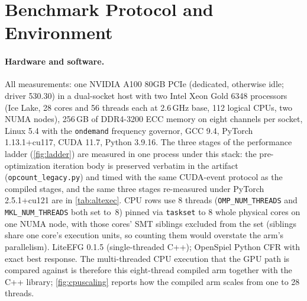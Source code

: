 \section{Benchmark Protocol and Environment}
\label{app:protocol}

\paragraph{Hardware and software.}
All measurements: one NVIDIA A100 80GB PCIe (dedicated, otherwise idle; driver
530.30) in a dual-socket host with two Intel Xeon Gold 6348 processors (Ice Lake,
28 cores and 56 threads each at 2.6\,GHz base, 112 logical CPUs, two NUMA nodes),
256\,GB of DDR4-3200 ECC memory on eight channels per socket, Linux 5.4 with the
\texttt{ondemand} frequency governor, GCC 9.4, PyTorch 1.13.1+cu117, CUDA 11.7,
Python 3.9.16. The three stages of the performance ladder (\cref{fig:ladder}) are
measured in one process under this stack: the pre-optimization iteration body is
preserved verbatim in the artifact (\texttt{opcount\_legacy.py}) and timed with the
same CUDA-event protocol as the compiled stages, and the same three stages re-measured
under PyTorch 2.5.1+cu121 are in \cref{tab:altexec}. CPU rows use 8
threads (\texttt{OMP\_NUM\_THREADS} and \texttt{MKL\_NUM\_THREADS} both set to~8)
pinned via
\texttt{taskset} to 8 whole physical cores on one NUMA node, with those cores' SMT
siblings excluded from the set (siblings share one core's execution units, so
counting them would overstate the arm's parallelism). LiteEFG 0.1.5 (single-threaded C++); OpenSpiel
Python CFR with exact best response. The multi-threaded CPU execution that the GPU
path is compared against is therefore this eight-thread compiled arm together with
the C++ library; \cref{fig:cpuscaling} reports how the compiled arm scales from one
to 28 threads.

